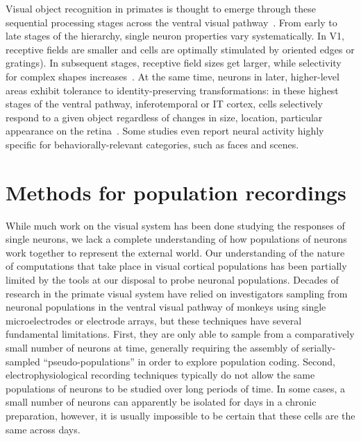 Visual object recognition in primates is thought to emerge through these sequential processing stages across the ventral visual pathway~\cite{Rust2010SelectivityIT, DiCarlo2007, DiCarlo2012}. From early to late stages of the hierarchy, single neuron properties vary systematically. In V1, receptive fields are smaller and cells are optimally stimulated by oriented edges or gratings\cite{Hubel1968}). In subsequent stages, receptive field sizes get larger, while selectivity for complex shapes increases~\cite{Desimone1984, Logothetis1996}. At the same time, neurons in later, higher-level areas exhibit tolerance to identity-preserving transformations: in these highest stages of the ventral pathway, inferotemporal or IT cortex, cells selectively respond to a given object regardless of changes in size, location, particular appearance on the retina~\cite{Tanaka1996, DiCarlo2012}. Some studies even report neural activity highly specific for behaviorally-relevant categories, such as faces\cite{Kanwisher1997, Tsao2006} and scenes\cite{Epstein1998}.

\section{Methods for population recordings}
While much work on the visual system has been done studying the responses of single neurons, we lack a complete understanding of how populations of neurons work together to represent the external world. Our understanding of the nature of computations that take place in visual cortical populations has been partially limited by the tools at our disposal to probe neuronal populations. Decades of research in the primate visual system have relied on investigators sampling from neuronal populations in the ventral visual pathway of monkeys using single microelectrodes or electrode arrays, but these techniques have several fundamental limitations. First, they are only able to sample from a comparatively small number of neurons at time, generally requiring the assembly of serially-sampled ``pseudo-populations'' in order to explore population coding. Second, electrophysiological recording techniques typically do not allow the same populations of neurons to be studied over long periods of time. In some cases, a small number of neurons can apparently be isolated for days in a chronic preparation, however, it is usually impossible to be certain that these cells are the same across days. 

